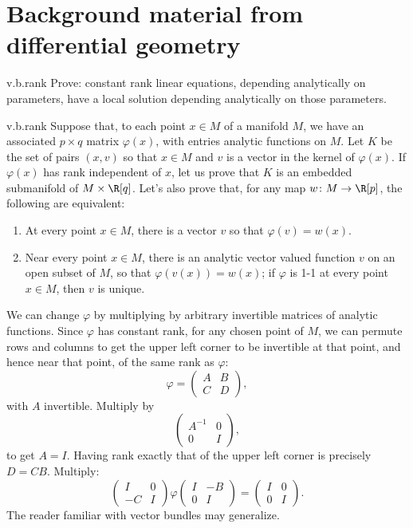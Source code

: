 \section{Background material from differential geometry}
\begin{problem}{v.b.rank}
Prove: constant rank linear equations, depending analytically on parameters, have a local solution depending analytically on those parameters.
\end{problem}
\begin{answer}{v.b.rank}
Suppose that, to each point \(x\in M\) of a manifold \(M\), we have an associated \(p \times q\) matrix \(\varphi(x)\), with entries analytic functions on \(M\).
Let \(K\) be the set of pairs \((x,v)\) so that \(x \in M\) and \(v\) is a vector in the kernel of \(\varphi(x)\).
If \(\varphi(x)\) has rank independent of \(x\), let us prove that \(K\) is an embedded submanifold of \(M \times \R[q]\).
Let's also prove that, for any map \(w\colon M \to \R[p]\), the following are equivalent:
\begin{enumerate}
\item At every point \(x \in M\), there is a vector \(v\) so that \(\varphi(v)=w(x)\).
\item Near every point \(x \in M\), there is an analytic vector valued function \(v\) on an open subset of \(M\), so that \(\varphi(v(x))=w(x)\); if \(\varphi\) is 1-1 at every point \(x \in M\), then \(v\) is unique.
\end{enumerate} 
We can change \(\varphi\) by multiplying by arbitrary invertible matrices of analytic functions.
Since \(\varphi\) has constant rank, for any chosen point of \(M\), we can permute rows and columns to get the upper left corner to be invertible at that point, and hence near that point, of the same rank as \(\varphi\):
\[
\varphi=
\begin{pmatrix}
A&B\\
C&D
\end{pmatrix},
\]
with \(A\) invertible.
Multiply by 
\[
\begin{pmatrix}
A^{-1}&0\\
0&I
\end{pmatrix},
\]
to get \(A=I\).
Having rank exactly that of the upper left corner is precisely \(D=CB\).
Multiply:
\[
\begin{pmatrix}
I&0\\
-C&I
\end{pmatrix}
\varphi
\begin{pmatrix}
I&-B\\
0&I
\end{pmatrix}=
\begin{pmatrix}
I&0\\
0&I
\end{pmatrix}.
\]
The reader familiar with vector bundles  \cite{Chern:1989} may generalize.
\end{answer}
